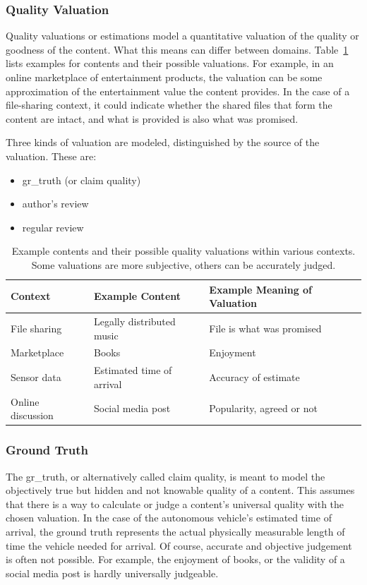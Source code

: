 \documentclass[%
    ]{\PathToTumTemplate/thesis/tum_thesis}
\begin{document}
\subsubsection{Quality Valuation}
Quality valuations or estimations model a quantitative valuation of the quality or goodness of the content.
What this means can differ between domains.
Table~\ref{tab:content_examples} lists examples for contents and their possible valuations.
For example, in an online marketplace of entertainment products, the valuation can be some approximation of the entertainment value the content provides.
In the case of a file-sharing context, it could indicate whether the shared files that form the content are intact, and what is provided is also what was promised.

Three kinds of valuation are modeled, distinguished by the source of the valuation. These are:
\begin{itemize}
	\item \gls{gr_truth} (or claim quality)
	\item author's review
	\item regular review
\end{itemize}


\begin{table}[tbp]
\centering
\begin{tabular}{lll}
\toprule
\textbf{Context}        & \textbf{Example Content} & \textbf{Example Meaning of Valuation} \\ \midrule
File sharing       & Legally distributed music & File is what was promised \\
Marketplace        & Books & Enjoyment \\
Sensor data     & Estimated time of arrival & Accuracy of estimate \\
Online discussion   & Social media post & Popularity, agreed or not \\
\bottomrule
\end{tabular}
\caption{
	Example contents and their possible quality valuations within various contexts.
	Some valuations are more subjective, others can be accurately judged.
}
\label{tab:content_examples}
\end{table}

\subsubsection{Ground Truth}\label{sec:approach_gr_truth}
The \gls{gr_truth}, or alternatively called claim quality, is meant to model the objectively true but hidden and not knowable quality of a content.
This assumes that there is a way to calculate or judge a content's universal quality with the chosen valuation.
In the case of the autonomous vehicle's estimated time of arrival, the ground truth represents the actual physically measurable length of time the vehicle needed for arrival.
Of course, accurate and objective judgement is often not possible.
For example, the enjoyment of books, or the validity of a social media post is hardly universally judgeable.
\end{document}
